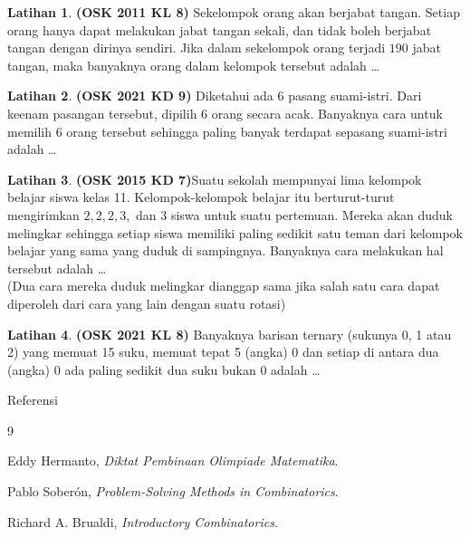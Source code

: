 \documentclass[aspectratio=169]{beamer}
\theoremstyle{definition}
\newtheorem{latihan}{Latihan}
\begin{document}
\begin{frame}{\insertsection}
  \begin{latihan}
    \textbf{(OSK 2011 KL 8)} Sekelompok orang akan berjabat tangan. Setiap orang hanya dapat melakukan jabat tangan sekali, dan tidak boleh berjabat tangan dengan dirinya sendiri. Jika dalam sekelompok orang terjadi $190$ jabat tangan, maka banyaknya orang dalam kelompok tersebut adalah \dots
  \end{latihan}
\end{frame}

\begin{frame}{\insertsection}
  \begin{latihan}
    \textbf{(OSK 2021 KD 9)}
    Diketahui ada 6 pasang suami-istri. Dari keenam pasangan tersebut, dipilih 6 orang secara acak. Banyaknya cara untuk memilih 6 orang tersebut sehingga paling banyak terdapat sepasang suami-istri adalah \ldots
  \end{latihan}
\end{frame}

\begin{frame}{\insertsection}
  \begin{latihan}
    \textbf{(OSK 2015 KD 7)}Suatu sekolah mempunyai lima kelompok belajar siswa kelas 11. Kelompok-kelompok belajar itu berturut-turut mengirimkan $2, 2, 2, 3,$ dan $3$ siswa untuk suatu pertemuan. Mereka akan duduk melingkar sehingga setiap siswa memiliki paling sedikit satu teman dari kelompok belajar yang sama yang duduk di sampingnya. Banyaknya cara melakukan hal tersebut adalah \ldots\\
    (Dua cara mereka duduk melingkar dianggap sama jika salah satu cara dapat diperoleh dari cara yang lain dengan suatu rotasi)
  \end{latihan}
\end{frame}

\begin{frame}{\insertsection}
  \begin{latihan}
    \textbf{(OSK 2021 KL 8)}
    Banyaknya barisan ternary (sukunya 0, 1 atau 2) yang memuat 15 suku, memuat tepat 5 (angka) 0 dan setiap di antara dua (angka) 0 ada paling sedikit dua suku bukan 0 adalah \ldots
  \end{latihan}
\end{frame}
\begin{frame}{Referensi}
  \begin{thebibliography}{9}

    Eddy Hermanto,
    \emph{Diktat Pembinaan Olimpiade Matematika}.

    Pablo Sober\'on,
    \emph{Problem-Solving Methods in Combinatorics}.

    Richard A. Brualdi,
    \emph{Introductory Combinatorics}.

  \end{thebibliography}
\end{frame}
\end{document}
